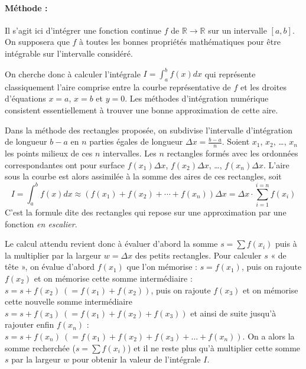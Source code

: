 \documentclass[11pt,a4paper]{article}
\begin{document}
\paragraph{Méthode :}
Il s'agit ici d'intégrer une fonction continue $f$ de $\mathbb{R} \rightarrow \mathbb{R}$ 
sur un intervalle $[a,b]$.
On supposera que $f$ à toutes les bonnes propriétés mathématiques pour être
intégrable sur l'intervalle considéré. 

On cherche donc à calculer l'intégrale
$\displaystyle I = \int_a^b f(x)dx$ qui représente classiquement l'aire
comprise entre la courbe représentative de $f$ et les droites d'équations 
$x=a$, $x=b$ et $y=0$. Les méthodes d'intégration numérique consistent 
essentiellement à trouver une bonne approximation de cette aire.

Dans la méthode des rectangles proposée, on subdivise l'intervalle d'intégration de
longueur $b-a$ en $n$ parties égales de longueur $\displaystyle\Delta x = \frac{b-a}{n}$. 
Soient $x_1$, $x_2$, \ldots, $x_n$ les points milieux de ces $n$ intervalles. 
Les $n$ rectangles formés avec les ordonnées correspondantes ont pour surface 
$f(x_1)\Delta x$, $f(x_2)\Delta x$, \ldots, $f(x_n)\Delta x$. 
L'aire sous la courbe est alors assimilée à la somme des aires de ces rectangles, soit 
$$\displaystyle I = \int_a^b f(x)dx \approx \left(f(x_1)+f(x_2)+\cdots+f(x_n)\right)\Delta x = 
\Delta x\cdot\sum_{i=1}^{i=n}f(x_i)$$ 
C'est la formule dite des rectangles qui repose sur une approximation par une fonction 
{\em en	escalier}.

Le calcul attendu revient donc à évaluer d'abord la somme $s = \sum f(x_i)$ puis
à la multiplier par la largeur $w = \Delta x$ des petits rectangles. 
Pour calculer $s$ « de tête »,
on évalue d'abord $f(x_1)$ que l'on mémorise : $s = f(x_1)$, 
puis on rajoute $f(x_2)$ et on mémorise cette somme intermédiaire : 
$s = s + f(x_2) \ (= f(x_1) + f(x_2))$, 
puis on rajoute $f(x_3)$ et on mémorise cette nouvelle somme intermédiaire  
$s = s + f(x_3) \ (= f(x_1) + f(x_2) + f(x_3))$
et ainsi de suite jusqu'à rajouter enfin $f(x_n)$ : 
$s = s + f(x_n) \ (= f(x_1) + f(x_2) + f(x_3) + \ldots + f(x_n))$. 
On a alors la somme recherchée ($s = \sum f(x_i)$) et
il ne reste plus qu'à multiplier cette somme $s$ par la largeur $w$ pour obtenir la valeur de l'intégrale $I$.
\end{document}
